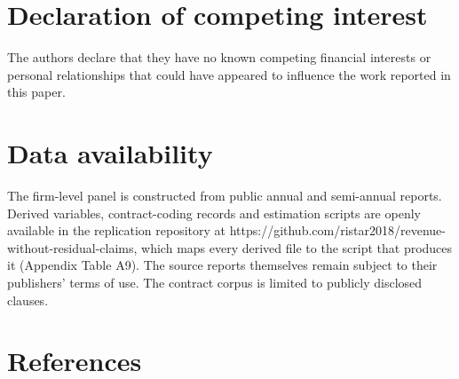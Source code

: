 \documentclass[review,3p,times]{elsarticle}
\begin{document}
\section*{Declaration of competing interest}

The authors declare that they have no known competing financial interests or personal relationships that could have appeared to influence the work reported in this paper.

\section*{Data availability}

The firm-level panel is constructed from public annual and semi-annual reports. Derived variables, contract-coding records and estimation scripts are openly available in the replication repository at https://github.com/ristar2018/revenue-without-residual-claims, which maps every derived file to the script that produces it (Appendix Table A9). The source reports themselves remain subject to their publishers' terms of use. The contract corpus is limited to publicly disclosed clauses.


\section*{References}
\end{document}

